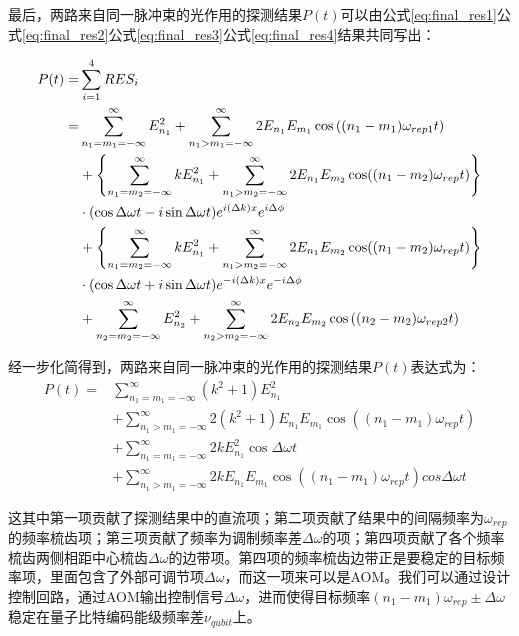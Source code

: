 最后，两路来自同一脉冲束的光作用的探测结果$P(t)$可以由公式\eqref{eq:final_res1}公式\eqref{eq:final_res2}公式\eqref{eq:final_res3}公式\eqref{eq:final_res4}结果共同写出：
\begin{small}
\begin{align}
    P(t)=&\sum_{i=1}^{4}RES_i\\
    =&\sum_{n_1=m_1=-\infty}^{\infty}E_{n_1}^2 + \sum_{n_1>m_1=-\infty}^{\infty}2E_{n_1} E_{m_1} \cos\left((n_1-m_1)\omega_{rep1}t\right)\\
    &+\left\{\sum_{n_1=m_2=-\infty}^{\infty}kE_{n_1}^2+\sum_{n_1>m_2=-\infty}^{\infty}2E_{n_1}E_{m_2}\cos((n_1-m_2)\omega_{rep}t)\right\}\notag\\
    & \cdot (\cos\Delta\omega t-i\sin\Delta\omega t)e^{i(\Delta k)x}e^{i\Delta\phi}\\
    &+\left\{\sum_{n_1=m_2=-\infty}^{\infty}kE_{n_1}^2+\sum_{n_1>m_2=-\infty}^{\infty}2E_{n_1}E_{m_2}\cos((n_1-m_2)\omega_{rep}t)\right\}\notag\\
    & \cdot (\cos\Delta\omega t+i\sin\Delta\omega t)e^{-i(\Delta k)x}e^{-i\Delta\phi}\\
    &+\sum_{n_2=m_2=-\infty}^{\infty}E_{n_2}^2 + \sum_{n_2>m_2=-\infty}^{\infty}2E_{n_2} E_{m_2} \cos\left((n_2-m_2)\omega_{rep2}t\right)
\end{align}
\end{small}

经一步化简得到，两路来自同一脉冲束的光作用的探测结果$P(t)$表达式为：
\begin{align}
    P(t)=&\sum_{n_1=m_1=-\infty}^{\infty}(k^2+1)E_{n_1}^2\\
    &+\sum_{n_1>m_1=-\infty}^{\infty}2(k^2+1)E_{n_1}E_{m_1}\cos\left((n_1-m_1)\omega_{rep}t\right)\\
    &+\sum_{n_1=m_1=-\infty}^{\infty}2kE_{n_1}^2\cos\Delta\omega t\\
    &+\sum_{n_1>m_1=-\infty}^{\infty}2kE_{n_1}E_{m_1}\cos\left((n_1-m_1)\omega_{rep}t\right)cos\Delta\omega t
\end{align}

这其中第一项贡献了探测结果中的直流项；第二项贡献了结果中的间隔频率为$\omega_{rep}$的频率梳齿项；第三项贡献了频率为调制频率差$\Delta\omega$的项；第四项贡献了各个频率梳齿两侧相距中心梳齿$\Delta\omega$的边带项。第四项的频率梳齿边带正是要稳定的目标频率项，里面包含了外部可调节项$\Delta\omega$，而这一项来可以是AOM。我们可以通过设计控制回路，通过AOM输出控制信号$\Delta\omega$，进而使得目标频率$(n_1-m_1)\omega_{rep}\pm \Delta\omega$稳定在量子比特编码能级频率差$\nu_{qubit}$上。

